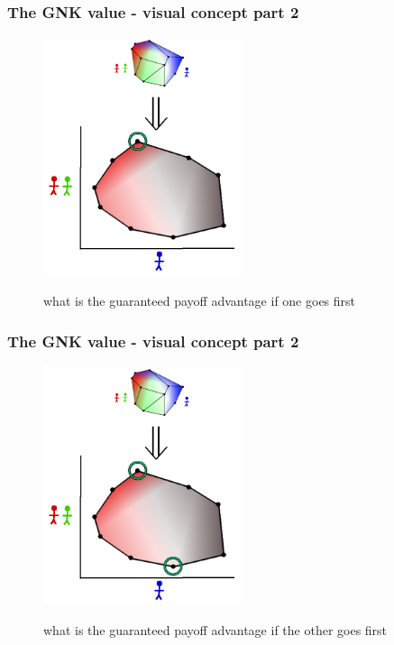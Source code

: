 \documentclass{beamer}
\begin{document}
\begin{frame} \frametitle{The GNK value - visual concept part 2} \begin{figure} \begin{center} \includegraphics[height=7cm]{figs/pa7} \end{center} what is the guaranteed payoff advantage if one goes first \end{figure} \end{frame}
\begin{frame} \frametitle{The GNK value - visual concept part 2} \begin{figure} \begin{center} \includegraphics[height=7cm]{figs/pa8} \end{center} what is the guaranteed payoff advantage if the other goes first \end{figure} \end{frame}
\end{document}
